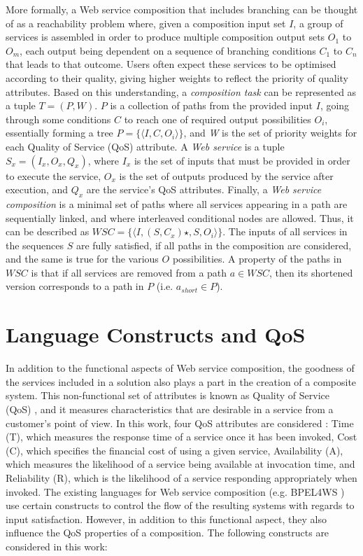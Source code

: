 More formally, a Web service composition that includes branching can be thought of as a reachability problem where, given a composition input set $I$, a group of services is assembled in order to produce multiple composition output sets $O_1$ to $O_m$, each output being dependent on a sequence of branching conditions $C_1$ to $C_n$ that leads to that outcome. Users often expect these services to be optimised according to their quality, giving higher weights to reflect the priority of quality attributes. Based on this understanding, a \textit{composition task} can be represented as a tuple $T = (P, W)$. $P$ is a collection of paths from the provided input $I$, going through some conditions $C$ to reach one of required output possibilities $O_i$, essentially forming a tree $P = \{\langle I,C,O_i\rangle\}$, and \textit{W} is the set of priority weights for each Quality of Service (QoS) attribute. A \textit{Web service} is a tuple $S_x = (I_x, O_x, Q_x)$, where $I_x$ is the set of inputs that must be provided in order to execute the service, $O_x$ is the set of outputs produced by the service after execution, and $Q_x$ are the service's QoS attributes. Finally, a \textit{Web service composition} is a minimal set of paths where all services appearing in a path are sequentially linked, and where interleaved conditional nodes are allowed. Thus, it can be described as $WSC = \{\langle I,(S,C_x)\star,S,O_i\rangle\}$. The inputs of all services in the sequences $S$ are fully satisfied, if all paths in the composition are considered, and the same is true for the various $O$ possibilities. A property of the paths in $WSC$ is that if all services are removed from a path $a \in WSC$, then its shortened version corresponds to a path in $P$ (i.e. $a_{short} \in P$).

\section{Language Constructs and QoS}

In addition to the functional aspects of Web service composition, the goodness of the services included in a solution also plays a part in the creation of a composite system. This non-functional set of attributes is known as Quality of Service (QoS) \cite{menasce2002qos}, and it measures characteristics that are desirable in a service from a customer's point of view. In this work, four QoS attributes are considered \cite{yu2013adaptive}: Time (T), which measures the response time of a service once it has been invoked, Cost (C), which specifies the financial cost of using a given service, Availability (A), which measures the likelihood of a service being available at invocation time, and Reliability (R), which is the likelihood of a service responding appropriately when invoked.
The existing languages for Web service composition (e.g. BPEL4WS \cite{wohed2003analysis}) use certain constructs to control the flow of the resulting systems with regards to input satisfaction. However, in addition to this functional aspect, they also influence the QoS properties of a composition. The following constructs are considered in this work:

